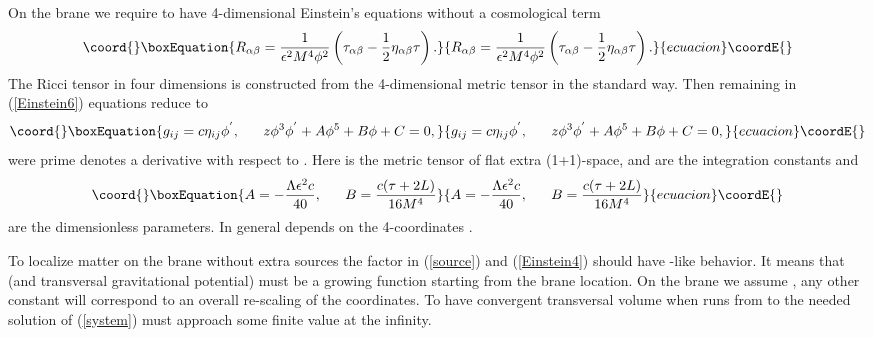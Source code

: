 \documentclass[a4paper,a4paper]{article}
\begin{document}
On the brane we require to have 4-dimensional Einstein's equations
without a cosmological term
\begin{equation}\coord{}\boxEquation{ \label{Einstein4}
R_{\alpha\beta} = \frac{1}{\epsilon^2 M^4\phi^2 }\left( \tau
_{\alpha\beta} - \frac{1}{2}\eta_{\alpha\beta}\tau\right).
}{ R_{\alpha\beta} = \frac{1}{\epsilon^2 M^4\phi^2 }\left( \tau
_{\alpha\beta} - \frac{1}{2}\eta_{\alpha\beta}\tau\right).
}{ecuacion}\coordE{}\end{equation}
The Ricci tensor in four dimensions \coordHE{} is
constructed from the 4-dimensional metric tensor
\coordHE{} in the standard way. Then remaining
in (\ref{Einstein6}) equations reduce to \cite{GoMi}
\begin{equation}\coord{}\boxEquation{ \label{system}
g_{ij} = c\eta _{ij}\phi^{'} , ~~~~~ z\phi^3 \phi^{'} + A\phi^5 +
B\phi + C = 0 ,
}{ g_{ij} = c\eta _{ij}\phi^{'} , ~~~~~ z\phi^3 \phi^{'} + A\phi^5 +
B\phi + C = 0 ,
}{ecuacion}\coordE{}\end{equation}
were prime denotes a derivative with respect to \coordHE{}. Here \coordHE{}
is the metric tensor of flat extra (1+1)-space, \coordHE{} and \coordHE{} are
the integration constants and
\begin{equation}\coord{}\boxEquation{ \label{parameters}
A = - \frac{\Lambda \epsilon^2 c}{40},~~~~~ B = \frac{c(\tau +
2L)}{16 M^4}
}{ A = - \frac{\Lambda \epsilon^2 c}{40},~~~~~ B = \frac{c(\tau +
2L)}{16 M^4}
}{ecuacion}\coordE{}\end{equation}
are the dimensionless parameters. In general \coordHE{} depends on the
4-coordinates \coordHE{}.

To localize matter on the brane without extra sources the factor
\coordHE{} in (\ref{source}) and (\ref{Einstein4}) should have
\myHighlight{$\delta$}\coordHE{}-like behavior. It means that \coordHE{} (and transversal
gravitational potential) must be a growing function starting from
the brane location. On the brane we assume \coordHE{}, any
other constant will correspond to an overall re-scaling of the
coordinates. To have convergent transversal volume when \coordHE{} runs
from \coordHE{} to \myHighlight{$\infty$}\coordHE{} the needed solution \coordHE{} of
(\ref{system}) must approach some finite value \coordHE{} at the
infinity.
\end{document}
